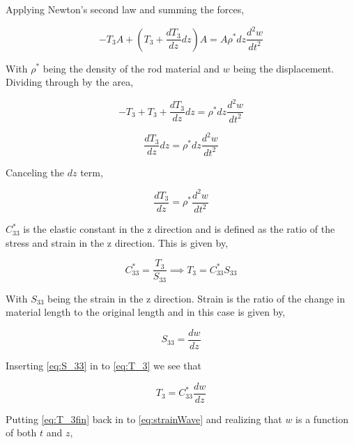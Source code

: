 Applying Newton's second law and summing the forces,

\begin{equation}
-T_3A + (T_3 + \frac{dT_3}{dz}dz)A = A\rho^* dz \frac{d^2w}{dt^2}
\end{equation}


With $\rho^*$ being the density of the rod material and $w$ being the displacement. Dividing through by the area,

\begin{equation}
-T_3 + T_3 + \frac{dT_3}{dz}dz = \rho^* dz \frac{d^2w}{dt^2}
\end{equation}

\begin{equation}
\frac{dT_3}{dz}dz = \rho^* dz \frac{d^2w}{dt^2}
\end{equation}

Canceling the $dz$ term,

\begin{equation}
\frac{dT_3}{dz} = \rho^* \frac{d^2w}{dt^2}
\label{eq:strainWave}
\end{equation}

$C^*_{33}$ is the elastic constant in the z direction and is defined as the ratio of the stress and strain in the z direction. This is given by,

\begin{equation}
C^*_{33} = \frac{T_3}{S_{33}} \implies T_3 = C^*_{33}S_{33}
\label{eq:T_3}
\end{equation}


With $S_{33}$ being the strain in the z direction. Strain is the ratio of the change in material length to the original length and in this case is given by,

\begin{equation}
S_{33} = \frac{dw}{dz}
\label{eq:S_33}
\end{equation}

Inserting \ref{eq:S_33} in to \ref{eq:T_3} we see that

\begin{equation}
T_3 = C^*_{33}\frac{dw}{dz}
\label{eq:T_3fin}
\end{equation}

Putting \ref{eq:T_3fin} back in to \ref{eq:strainWave} and realizing that $w$ is a function of both $t$ and $z$,

